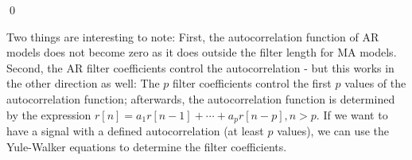 \qed

Two things are interesting to note: First, the autocorrelation function of AR models does not become zero as it does outside the filter length for MA models. Second, the AR filter coefficients control the autocorrelation - but this works in the other direction as well: The $p$ filter coefficients control the first $p$ values of the autocorrelation function; afterwards, the autocorrelation function is determined by the expression $r[n] = a_1 r[n-1] + \cdots + a_p r[n-p], n>p$. If we want to have a signal with a defined autocorrelation (at least $p$ values), we can use the Yule-Walker equations to determine the filter coefficients.




